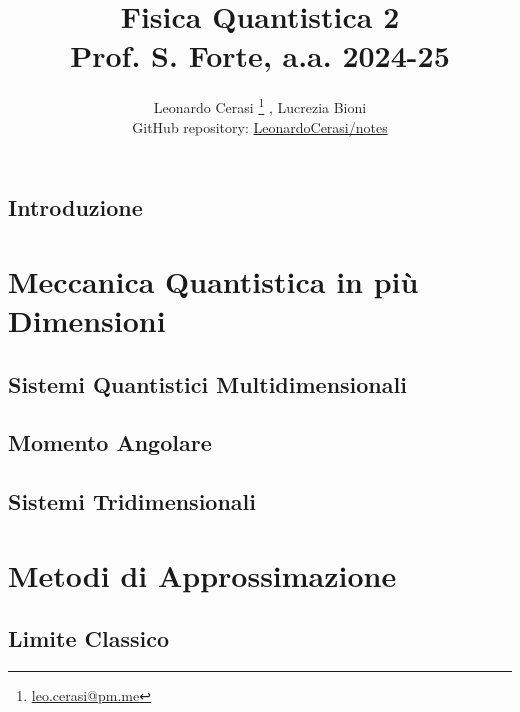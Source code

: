 \documentclass[a4paper, 12pt, openany]{book}
\author{Leonardo Cerasi%
	\thanks{\scriptsize\href{mailto:leonardo.cerasi@studenti.unimi.it}{leo.cerasi@pm.me}}%
	, Lucrezia Bioni\\
	\small GitHub repository: \href{https://github.com/LeonardoCerasi/notes}{LeonardoCerasi/notes}}
\title{\Huge\textbf{Fisica Quantistica 2} \\ \large Prof. S. Forte, a.a. 2024-25}
\begin{document}
\frontmatter

\maketitle

\tableofcontents
\pagestyle{indice}

\mainmatter

\chapter*{Introduzione}
\pagestyle{introd}


\part{Meccanica Quantistica in più Dimensioni}
\pagestyle{body}

\chapter{Sistemi Quantistici Multidimensionali}


\chapter{Momento Angolare}


\chapter{Sistemi Tridimensionali}


\part{Metodi di Approssimazione}
\pagestyle{body}

\chapter{Limite Classico}

\end{document}
